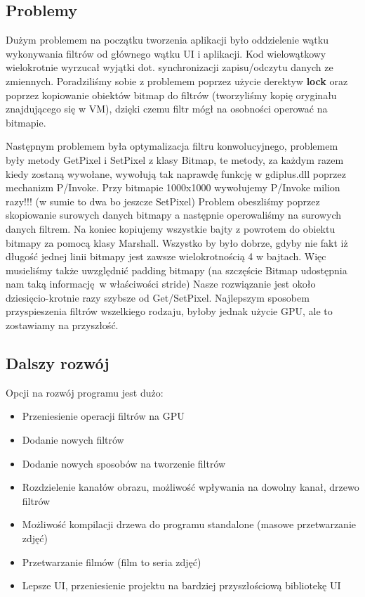 \documentclass{article}
\begin{document}
\subsection{Problemy}
Dużym problemem na początku tworzenia aplikacji było oddzielenie wątku wykonywania filtrów od głównego wątku UI i aplikacji.
Kod wielowątkowy wielokrotnie wyrzucał wyjątki dot. synchronizacji zapisu/odczytu danych ze zmiennych.
Poradziliśmy sobie z problemem poprzez użycie derektyw \textbf{lock} oraz poprzez kopiowanie obiektów bitmap do filtrów 
(tworzyliśmy kopię oryginału znajdującego się w VM), dzięki czemu filtr mógł na osobności operować na bitmapie.

Następnym problemem była optymalizacja filtru konwolucyjnego, problemem były metody GetPixel i SetPixel z klasy Bitmap,
te metody, za każdym razem kiedy zostaną wywołane, wywołują tak naprawdę funkcję w gdiplus.dll poprzez mechanizm P/Invoke.
Przy bitmapie 1000x1000 wywołujemy P/Invoke milion razy!!! (w sumie to dwa bo jeszcze SetPixel)
Problem obeszliśmy poprzez skopiowanie surowych danych bitmapy a następnie operowaliśmy na surowych danych filtrem.
Na koniec kopiujemy wszystkie bajty z powrotem do obiektu bitmapy za pomocą klasy Marshall.
Wszystko by było dobrze, gdyby nie fakt iż długość jednej linii bitmapy jest zawsze wielokrotnością 4 w bajtach.
Więc musieliśmy także uwzględnić padding bitmapy (na szczęście Bitmap udostępnia nam taką informację w właściwości stride)
Nasze rozwiązanie jest około dziesięcio-krotnie razy szybsze od Get/SetPixel.
Najlepszym sposobem przyspieszenia filtrów wszelkiego rodzaju, byłoby jednak użycie
GPU, ale to zostawiamy na przyszłość.



\subsection{Dalszy rozwój}
Opcji na rozwój programu jest dużo:
\begin{itemize}
    \item Przeniesienie operacji filtrów na GPU 
    \item Dodanie nowych filtrów
    \item Dodanie nowych sposobów na tworzenie filtrów
    \item Rozdzielenie kanałów obrazu, możliwość wpływania na dowolny kanał, drzewo filtrów
    \item Możliwość kompilacji drzewa do programu standalone (masowe przetwarzanie zdjęć)
    \item Przetwarzanie filmów (film to seria zdjęć)
    \item Lepsze UI, przeniesienie projektu na bardziej przyszłościową bibliotekę UI
\end{itemize}
\end{document}

